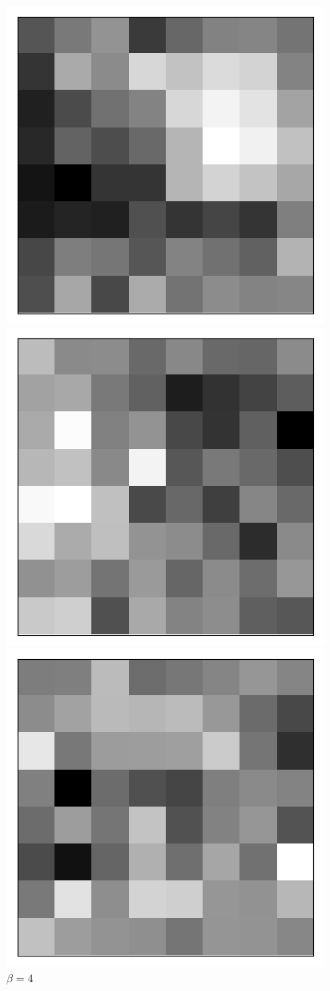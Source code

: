 \begin{figure}[h!]
\begin{multicols}{4}
    \includegraphics[scale=0.4]{figures/results/latent_image/beta_1_sample_90_latent.png}
    \caption{$\beta=1$}
    \includegraphics[scale=0.4]{figures/results/latent_image/beta_4_sample_90_latent.png}
    \caption{$\beta=4$}
    \includegraphics[scale=0.4]{figures/results/latent_image/beta_16_sample_90_latent.png}

\end{multicols}
\end{figure}
